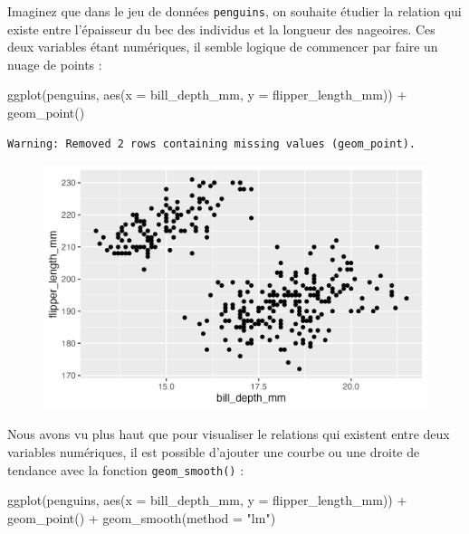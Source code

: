 \documentclass[
  letterpaper,
  DIV=11,
  numbers=noendperiod]{scrreprt}
\newenvironment{Shaded}{\begin{snugshade}}{\end{snugshade}}
\newcommand{\AttributeTok}[1]{\textcolor[rgb]{0.40,0.45,0.13}{#1}}
\newcommand{\FunctionTok}[1]{\textcolor[rgb]{0.28,0.35,0.67}{#1}}
\newcommand{\NormalTok}[1]{\textcolor[rgb]{0.00,0.23,0.31}{#1}}
\newcommand{\SpecialCharTok}[1]{\textcolor[rgb]{0.37,0.37,0.37}{#1}}
\newcommand{\StringTok}[1]{\textcolor[rgb]{0.13,0.47,0.30}{#1}}
\begin{document}
Imaginez que dans le jeu de données \texttt{penguins}, on souhaite
étudier la relation qui existe entre l'épaisseur du bec des individus et
la longueur des nageoires. Ces deux variables étant numériques, il
semble logique de commencer par faire un nuage de points :

\begin{Shaded}
\begin{Highlighting}[]
\FunctionTok{ggplot}\NormalTok{(penguins, }\FunctionTok{aes}\NormalTok{(}\AttributeTok{x =}\NormalTok{ bill\_depth\_mm, }\AttributeTok{y =}\NormalTok{ flipper\_length\_mm)) }\SpecialCharTok{+}
  \FunctionTok{geom\_point}\NormalTok{()}
\end{Highlighting}
\end{Shaded}

\begin{verbatim}
Warning: Removed 2 rows containing missing values (geom_point).
\end{verbatim}

\begin{figure}[H]

{\centering \includegraphics{./03-visualization_files/figure-pdf/unnamed-chunk-81-1.png}

}

\end{figure}

Nous avons vu plus haut que pour visualiser le relations qui existent
entre deux variables numériques, il est possible d'ajouter une courbe ou
une droite de tendance avec la fonction \texttt{geom\_smooth()} :

\begin{Shaded}
\begin{Highlighting}[]
\FunctionTok{ggplot}\NormalTok{(penguins, }\FunctionTok{aes}\NormalTok{(}\AttributeTok{x =}\NormalTok{ bill\_depth\_mm, }\AttributeTok{y =}\NormalTok{ flipper\_length\_mm)) }\SpecialCharTok{+}
  \FunctionTok{geom\_point}\NormalTok{() }\SpecialCharTok{+}
  \FunctionTok{geom\_smooth}\NormalTok{(}\AttributeTok{method =} \StringTok{"lm"}\NormalTok{)}
\end{Highlighting}
\end{Shaded}
\end{document}
